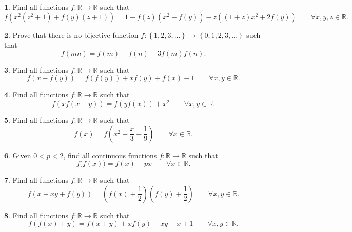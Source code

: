 \documentclass{article}
\theoremstyle{definition}
\newtheorem{p}{}
\begin{document}
\begin{p}
Find all functions $ f: \mathbb R \to \mathbb R$ such that
\[f(x^2(z^2 + 1) + f(y)(z + 1)) = 1 - f(z)(x^2 + f(y)) - z((1 + z)x^2 + 2f(y)) \qquad \forall x,y,z \in \mathbb R.\]
\end{p}



\begin{p}
Prove that there is no bijective function $f : \left\{1,2,3,...\right\}\rightarrow \left\{0,1,2,3, ...\right\}$ such that
\[f(mn)=f(m)+f(n)+3f(m)f(n).\]
\end{p}





\begin{p}
Find all functions $ f: \mathbb R \to \mathbb R$ such that
\[f(x-f(y)) = f(f(y)) + xf(y) + f(x) - 1 \qquad \forall x,y \in \mathbb R.\]
\end{p}



\begin{p}
Find all functions $ f: \mathbb R \to \mathbb R$ such that
\[f(xf(x+y))=f(yf(x))+x^2 \qquad \forall x,y \in \mathbb R.\]
\end{p}



\begin{p}
Find all functions $ f: \mathbb R \to \mathbb R$ such that
\[ f(x)=f\left(x^{2}+\frac{x}{3}+\frac{1}{9}\right) \qquad \forall x \in \mathbb R.\]
\end{p}





\begin{p}
Given $0<p<2$, find all continuous functions $ f: \mathbb R \to \mathbb R$ such that
\[f\big(f(x)\big) = f(x)+px \qquad \forall x \in \mathbb R.\]
\end{p}





\begin{p}
Find all functions $ f: \mathbb R \to \mathbb R$ such that
\[f(x+xy+f(y)) = \left(f(x)+\frac{1}{2}\right) \left(f(y)+\frac{1}{2}\right) \qquad \forall x,y \in \mathbb R.\]
\end{p}



\begin{p}
Find all functions $ f: \mathbb R \to \mathbb R$ such that
\[f(f(x) + y) = f(x + y) + xf(y) - xy - x + 1 \qquad \forall x,y \in \mathbb R.\]
\end{p}
\end{document}
